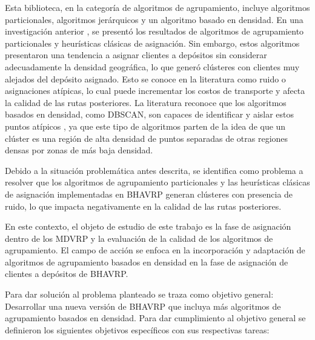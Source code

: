 Esta biblioteca, en la categoría de algoritmos de agrupamiento, incluye algoritmos particionales, algoritmos jerárquicos y un algoritmo basado en densidad. En una investigación anterior \parencite{ericramosaragonIncorporacionModuloMetricas2025}, se presentó los resultados de algoritmos de agrupamiento particionales y heurísticas clásicas de asignación. Sin embargo, estos algoritmos presentaron una tendencia a asignar clientes a depósitos sin considerar adecuadamente la densidad geográfica, lo que generó clústeres con clientes muy alejados del depósito asignado. Esto se conoce en la literatura como ruido o asignaciones atípicas, lo cual puede incrementar los costos de transporte y afecta la calidad de las rutas posteriores. La literatura reconoce que los algoritmos basados en densidad, como DBSCAN, son capaces de identificar y aislar estos puntos atípicos \parencite{khanDBSCANPresentFuture2014}, ya que este tipo de algoritmos parten de la idea de que un clúster es una región de alta densidad de puntos separadas de otras regiones densas por zonas de más baja densidad.

Debido a la situación problemática antes descrita, se identifica como problema a resolver que los algoritmos de agrupamiento particionales y las heurísticas clásicas de asignación implementadas en BHAVRP generan clústeres con presencia de ruido, lo que impacta negativamente en la calidad de las rutas posteriores.

En este contexto, el objeto de estudio de este trabajo es la fase de asignación dentro de los MDVRP y la evaluación de la calidad de los algoritmos de agrupamiento. El campo de acción se enfoca en la incorporación y adaptación de algoritmos de agrupamiento basados en densidad en la fase de asignación de clientes a depósitos de BHAVRP.

Para dar solución al problema planteado se traza como objetivo general: Desarrollar una nueva versión de BHAVRP que incluya más algoritmos de agrupamiento basados en densidad.
Para dar cumplimiento al objetivo general se definieron los siguientes objetivos específicos con sus respectivas tareas:

